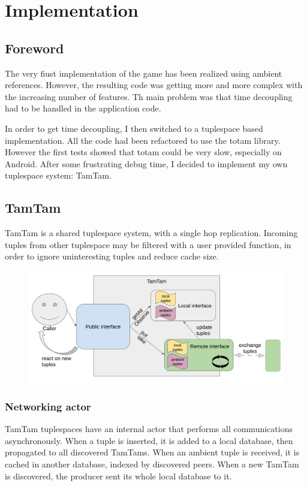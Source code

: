 \documentclass[a4paper,12pt]{article}
\begin{document}
\section{Implementation}
\subsection{Foreword}
The very fiust implementation of the game has been realized using ambient references. However, the resulting code was getting more and more complex with the increasing number of features. Th main problem was that time decoupling had to be handled in the application code.

In order to get time decoupling, I then switched to a tuplespace based implementation. All the code had been refactored to use the totam library. However the first tests showed that totam could be very slow, especially on Android. After some frustrating debug time, I decided to implement my own tuplespace system: TamTam.

\subsection{TamTam}
TamTam is a shared tuplespace system, with a single hop replication. Incoming tuples from other tuplespace may be filtered with a user provided function, in order to ignore uninteresting tuples and reduce cache size.

\begin{figure}[H]
  \center
  \includegraphics[width=\textwidth]{tamtam.png}
\end{figure}

\subsubsection{Networking actor}
TamTam tuplespaces have an internal actor that performs all communications asynchronously. When a tuple is inserted, it is added to a local database, then propagated to all discovered TamTams. When an ambient tuple is received, it is cached in another database, indexed by discovered peers. When a new TamTam is discovered, the producer sent its whole local database to it.
\end{document}
